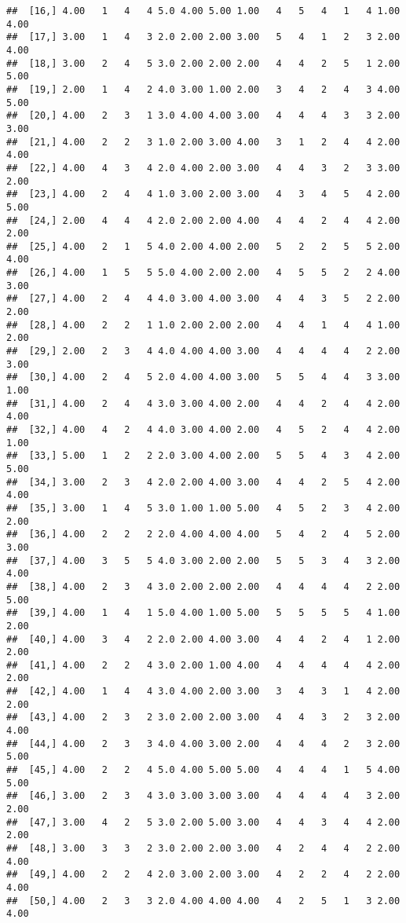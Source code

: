 \documentclass[]{article}
\begin{document}
\begin{verbatim}
##  [16,] 4.00   1   4   4 5.0 4.00 5.00 1.00   4   5   4   1   4 1.00 4.00
##  [17,] 3.00   1   4   3 2.0 2.00 2.00 3.00   5   4   1   2   3 2.00 4.00
##  [18,] 3.00   2   4   5 3.0 2.00 2.00 2.00   4   4   2   5   1 2.00 5.00
##  [19,] 2.00   1   4   2 4.0 3.00 1.00 2.00   3   4   2   4   3 4.00 5.00
##  [20,] 4.00   2   3   1 3.0 4.00 4.00 3.00   4   4   4   3   3 2.00 3.00
##  [21,] 4.00   2   2   3 1.0 2.00 3.00 4.00   3   1   2   4   4 2.00 4.00
##  [22,] 4.00   4   3   4 2.0 4.00 2.00 3.00   4   4   3   2   3 3.00 2.00
##  [23,] 4.00   2   4   4 1.0 3.00 2.00 3.00   4   3   4   5   4 2.00 5.00
##  [24,] 2.00   4   4   4 2.0 2.00 2.00 4.00   4   4   2   4   4 2.00 2.00
##  [25,] 4.00   2   1   5 4.0 2.00 4.00 2.00   5   2   2   5   5 2.00 4.00
##  [26,] 4.00   1   5   5 5.0 4.00 2.00 2.00   4   5   5   2   2 4.00 3.00
##  [27,] 4.00   2   4   4 4.0 3.00 4.00 3.00   4   4   3   5   2 2.00 2.00
##  [28,] 4.00   2   2   1 1.0 2.00 2.00 2.00   4   4   1   4   4 1.00 2.00
##  [29,] 2.00   2   3   4 4.0 4.00 4.00 3.00   4   4   4   4   2 2.00 3.00
##  [30,] 4.00   2   4   5 2.0 4.00 4.00 3.00   5   5   4   4   3 3.00 1.00
##  [31,] 4.00   2   4   4 3.0 3.00 4.00 2.00   4   4   2   4   4 2.00 4.00
##  [32,] 4.00   4   2   4 4.0 3.00 4.00 2.00   4   5   2   4   4 2.00 1.00
##  [33,] 5.00   1   2   2 2.0 3.00 4.00 2.00   5   5   4   3   4 2.00 5.00
##  [34,] 3.00   2   3   4 2.0 2.00 4.00 3.00   4   4   2   5   4 2.00 4.00
##  [35,] 3.00   1   4   5 3.0 1.00 1.00 5.00   4   5   2   3   4 2.00 2.00
##  [36,] 4.00   2   2   2 2.0 4.00 4.00 4.00   5   4   2   4   5 2.00 3.00
##  [37,] 4.00   3   5   5 4.0 3.00 2.00 2.00   5   5   3   4   3 2.00 4.00
##  [38,] 4.00   2   3   4 3.0 2.00 2.00 2.00   4   4   4   4   2 2.00 5.00
##  [39,] 4.00   1   4   1 5.0 4.00 1.00 5.00   5   5   5   5   4 1.00 2.00
##  [40,] 4.00   3   4   2 2.0 2.00 4.00 3.00   4   4   2   4   1 2.00 2.00
##  [41,] 4.00   2   2   4 3.0 2.00 1.00 4.00   4   4   4   4   4 2.00 2.00
##  [42,] 4.00   1   4   4 3.0 4.00 2.00 3.00   3   4   3   1   4 2.00 2.00
##  [43,] 4.00   2   3   2 3.0 2.00 2.00 3.00   4   4   3   2   3 2.00 4.00
##  [44,] 4.00   2   3   3 4.0 4.00 3.00 2.00   4   4   4   2   3 2.00 5.00
##  [45,] 4.00   2   2   4 5.0 4.00 5.00 5.00   4   4   4   1   5 4.00 5.00
##  [46,] 3.00   2   3   4 3.0 3.00 3.00 3.00   4   4   4   4   3 2.00 2.00
##  [47,] 3.00   4   2   5 3.0 2.00 5.00 3.00   4   4   3   4   4 2.00 2.00
##  [48,] 3.00   3   3   2 3.0 2.00 2.00 3.00   4   2   4   4   2 2.00 4.00
##  [49,] 4.00   2   2   4 2.0 3.00 2.00 3.00   4   2   2   4   2 2.00 4.00
##  [50,] 4.00   2   3   3 2.0 4.00 4.00 4.00   4   2   5   1   3 2.00 4.00

\end{verbatim}
\end{document}
